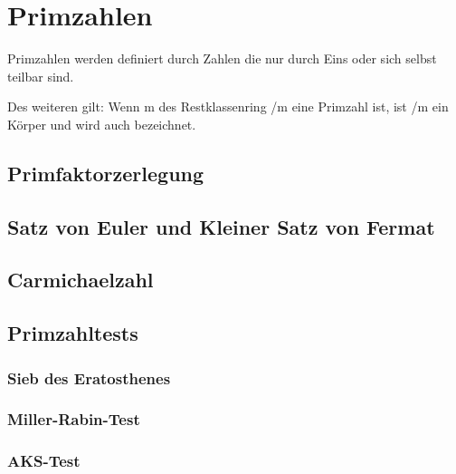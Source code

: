 \section{Primzahlen}
	Primzahlen werden definiert durch Zahlen die nur durch Eins oder sich selbst teilbar sind.
	
	Des weiteren gilt: Wenn m des Restklassenring /m eine Primzahl ist, ist /m ein Körper und wird auch  bezeichnet.

	\subsection{Primfaktorzerlegung}
	\subsection{Satz von Euler und Kleiner Satz von Fermat}
	\subsection{Carmichaelzahl}
	\subsection{Primzahltests}
		\subsubsection{Sieb des Eratosthenes}
		\subsubsection{Miller-Rabin-Test}
		\subsubsection{AKS-Test}